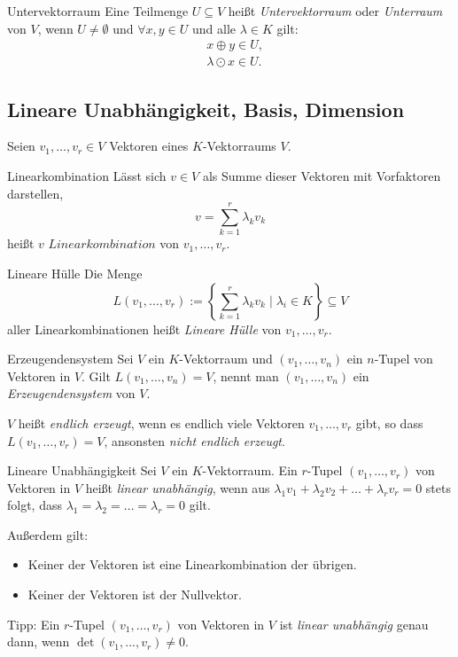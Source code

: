 \documentclass[german]{../spicker}
\begin{document}
\begin{defi}{Untervektorraum}
    Eine Teilmenge $U \subseteq V$ heißt \emph{Untervektorraum} oder \emph{Unterraum} von $V$, wenn $U \neq \emptyset$ und $\forall x, y \in U$ und alle $\lambda \in K$ gilt:
    $$
        \begin{aligned}
             & x \oplus y \in U,      \\
             & \lambda \odot x \in U.
        \end{aligned}
    $$
\end{defi}

\newpage
\subsection{Lineare Unabhängigkeit, Basis, Dimension}

Seien $v_1, \ldots, v_r \in V$ Vektoren eines $K$-Vektorraums $V$.

\begin{defi}{Linearkombination}
    Lässt sich $v\in V$ als Summe dieser Vektoren mit Vorfaktoren darstellen,
    $$
        v = \sum^r_{k=1} \lambda_kv_k
    $$
    heißt $v$ $Linearkombination$ von $v_1, \ldots, v_r$.
\end{defi}

\begin{defi}{Lineare Hülle}
    Die Menge
    $$
        L(v_1, \ldots, v_r) := \left\{ \sum^r_{k=1} \lambda_kv_k \mid \lambda_i \in K \right\} \subseteq V
    $$
    aller Linearkombinationen heißt \emph{Lineare Hülle} von $v_1, \ldots, v_r$.
\end{defi}

\begin{defi}{Erzeugendensystem}
    Sei $V$ ein $K$-Vektorraum und $(v_1, \ldots, v_n)$ ein $n$-Tupel von Vektoren in $V$.
    Gilt $L(v_1, \ldots, v_n) = V$, nennt man $(v_1, \ldots, v_n)$ ein \emph{Erzeugendensystem} von $V$.

    $V$ heißt \emph{endlich erzeugt}, wenn es endlich viele Vektoren $v_1, \ldots, v_r$ gibt, so dass  $L(v_1, \ldots, v_r) = V$, ansonsten \emph{nicht endlich erzeugt}.
\end{defi}

\begin{defi}{Lineare Unabhängigkeit}
    Sei $V$ ein $K$-Vektorraum. Ein $r$-Tupel $(v_1, \ldots, v_r)$ von Vektoren in $V$ heißt \emph{linear unabhängig}, wenn aus $\lambda_1v_1 +\lambda_2v_2 + \ldots + \lambda_rv_r = 0$ stets folgt, dass $\lambda_1 = \lambda_2 = \ldots = \lambda_r = 0$ gilt.

    Außerdem gilt:
    \begin{itemize}
        \item Keiner der Vektoren ist eine Linearkombination der übrigen.
        \item Keiner der Vektoren ist der Nullvektor.
    \end{itemize}

    Tipp: Ein $r$-Tupel $(v_1, \ldots, v_r)$ von Vektoren in $V$ ist \emph{linear unabhängig} genau dann, wenn $\det(v_1, \ldots, v_r) \neq 0$.
\end{defi}
\end{document}
